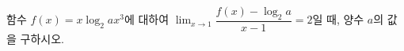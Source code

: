 함수 $f(x)=x\log_2 ax^3$에 대하여 $\displaystyle\lim_{x\to 1}\dfrac{f(x)-\log_2 a}{x-1}=2$일 때, 양수 $a$의 값을 구하시오.
